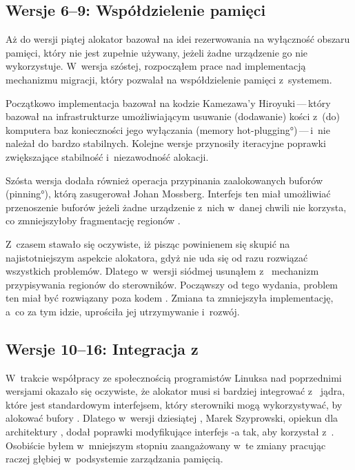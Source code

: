 \subsection{Wersje 6--9: Współdzielenie pamięci}

Aż do wersji piątej alokator  bazował na idei rezerwowania na
wyłączność obszaru pamięci, który nie jest zupełnie używany, jeżeli
żadne urządzenie go nie wykorzystuje.  W~wersja szóstej, rozpocząłem
prace nad implementacją mechanizmu migracji, który pozwalał na
współdzielenie pamięci  z~systemem.

Początkowo implementacja bazował na kodzie Kamezawa'y
Hiroyuki\,---\,który bazował na infrastrukturze umożliwiającym
usuwanie (dodawanie) kości  z~(do) komputera baz konieczności jego
wyłączania (\ang{memory hot-plugging})\,---\,i~nie należał do bardzo
stabilnych.  Kolejne wersje  przynosiły iteracyjne poprawki
zwiększające stabilność i~niezawodność alokacji.

Szósta wersja  dodała również operacja przypinania zaalokowanych
buforów (\ang{pinning}), którą zasugerował Johan Mossberg.  Interfejs
ten miał umożliwiać przenoszenie buforów  jeżeli żadne urządzenie
z~nich w~danej chwili nie korzysta, co zmniejszyłoby fragmentację
regionów .

Z~czasem stawało się oczywiste, iż pisząc  powinienem się skupić na
najistotniejszym aspekcie alokatora, gdyż nie uda się od razu
rozwiązać wszystkich problemów.  Dlatego w~wersji siódmej usunąłem
z~ mechanizm przypisywania regionów  do sterowników.  Począwszy
od tego wydania, problem ten miał być rozwiązany poza kodem .
Zmiana ta zmniejszyła implementację, a~co za tym idzie, uprościła jej
utrzymywanie i~rozwój.

\subsection{Wersje 10--16: Integracja z~ }

W~trakcie współpracy ze społecznością programistów Linuksa nad
poprzednimi wersjami  okazało się oczywiste, że alokator musi si
bardziej integrować z~  jądra, które jest standardowym
interfejsem, który sterowniki mogą wykorzystywać, by alokować bufory
.  Dlatego w~wersji dziesiątej , Marek Szyprowski, opiekun 
 dla architektury , dodał poprawki modyfikujące interfejs 
-a tak, aby korzystał z~.  Osobiście byłem w~mniejszym stopniu
zaangażowany w~te zmiany pracując raczej głębiej w~podsystemie
zarządzania pamięcią.

